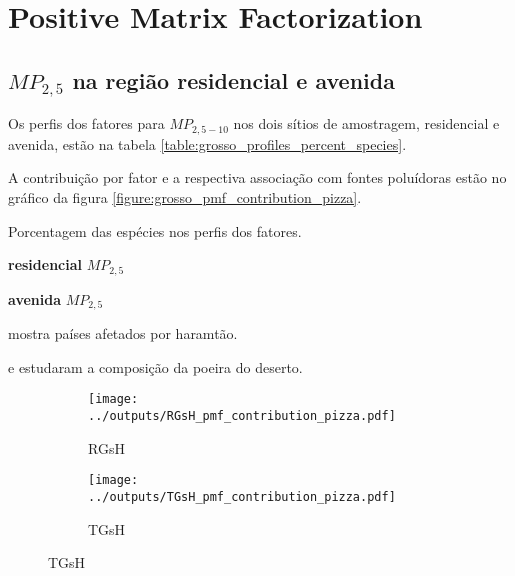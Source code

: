 \section{Positive Matrix Factorization}


\subsection{$MP_{2,5}$ na região residencial e avenida}

Os perfis dos fatores para $MP_{2,5-10}$ nos dois sítios de amostragem, 
residencial e avenida, estão na tabela \ref{table:grosso_profiles_percent_species}.

A contribuição por fator e a respectiva associação com fontes poluídoras
estão no gráfico da figura \ref{figure:grosso_pmf_contribution_pizza}. 

\begin{table}[H]%
  \begin{scriptsize} 
    \caption{Porcentagem das espécies nos perfis dos fatores.
    \label{table:grosso_profiles_percent_species}}


    \begin{subtable}{.4\textwidth}
      \centering

        \caption{\textbf{residencial} $MP_{2,5}$ \label{table:RGsH_profiles_percent_species}}
        
    \end{subtable}%

  
    \begin{subtable}{.4\linewidth}
      \centering

        \caption{\textbf{avenida}  $MP_{2,5}$\label{table:TGsH_profiles_percent_species}}
        
    \end{subtable} 


  \end{scriptsize} 
\end{table}



\cite{kaku2016}


\cite{prospero2002} mostra países afetados por haramtão. 

\cite{engelbrecht2009a} e \cite{engelbrecht2009b} estudaram a composição 
da poeira do deserto.


\begin{figure}[H]
  \caption{Contribuição das espécie nos Fatores para $MP_{2,5-10}$
  \label{figure:grosso_pmf_contribution_pizza}}
  \begin{subfigure}[b]{0.5\textwidth}
    \texttt{[image: ../outputs/RGsH\_pmf\_contribution\_pizza.pdf]}
    \caption{RGsH}
  \end{subfigure}%
  \begin{subfigure}[b]{0.5\textwidth}
    \texttt{[image: ../outputs/TGsH\_pmf\_contribution\_pizza.pdf]}
    \caption{TGsH}
  \end{subfigure}
\end{figure}

